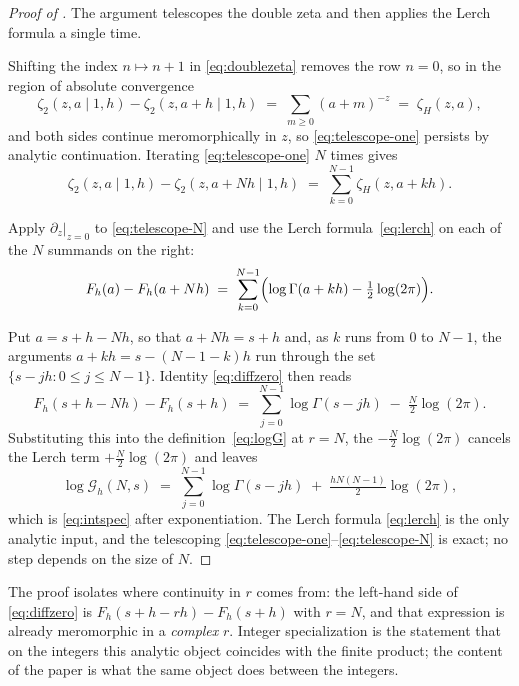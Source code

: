 \documentclass[11pt,letterpaper]{article}
\newcommand{\Gc}{\mathcal{G}}               %
\newcommand{\Fh}{F_h}
\newcommand{\Zt}{\zeta_2}
\begin{document}
\begin{proof}[Proof of ]
The argument telescopes the double zeta and then applies the Lerch formula a
single time.

Shifting the index $n\mapsto n+1$ in \eqref{eq:doublezeta} removes the row
$n=0$, so in the region of absolute convergence
\begin{equation}
  \Zt(z,a\mid 1,h)-\Zt(z,a+h\mid 1,h)\;=\;\sum_{m\ge 0}(a+m)^{-z}\;=\;\zeta_H(z,a),
  \label{eq:telescope-one}
\end{equation}
and both sides continue meromorphically in $z$, so \eqref{eq:telescope-one}
persists by analytic continuation. Iterating \eqref{eq:telescope-one} $N$ times
gives
\begin{equation}
  \Zt(z,a\mid 1,h)-\Zt(z,a+Nh\mid 1,h)
  \;=\;\sum_{k=0}^{N-1}\zeta_H(z,a+kh).
  \label{eq:telescope-N}
\end{equation}

Apply $\partial_z|_{z=0}$ to \eqref{eq:telescope-N} and use the Lerch
formula~\eqref{eq:lerch} on each of the $N$ summands on the right:
\begin{equation}
  \Fh(a)-\Fh(a+Nh)
  \;=\;\sum_{k=0}^{N-1}\Bigl(\log\Gamma(a+kh)-\tfrac12\log(2\pi)\Bigr).
  \label{eq:diffzero}
\end{equation}

Put $a=s+h-Nh$, so that $a+Nh=s+h$ and, as $k$ runs from $0$ to $N-1$, the
arguments $a+kh=s-(N-1-k)h$ run through the set $\{s-jh:0\le j\le N-1\}$.
Identity \eqref{eq:diffzero} then reads
\begin{equation*}
  \Fh(s+h-Nh)-\Fh(s+h)
  \;=\;\sum_{j=0}^{N-1}\log\Gamma(s-jh)\;-\;\tfrac{N}{2}\log(2\pi).
\end{equation*}
Substituting this into the definition~\eqref{eq:logG} at $r=N$, the
$-\tfrac{N}{2}\log(2\pi)$ cancels the Lerch term $+\tfrac{N}{2}\log(2\pi)$ and
leaves
\begin{equation*}
  \log\Gc_h(N,s)
  \;=\;\sum_{j=0}^{N-1}\log\Gamma(s-jh)\;+\;\tfrac{h N(N-1)}{2}\log(2\pi),
\end{equation*}
which is \eqref{eq:intspec} after exponentiation. The Lerch formula
\eqref{eq:lerch} is the only analytic input, and the telescoping
\eqref{eq:telescope-one}--\eqref{eq:telescope-N} is exact; no step depends on
the size of $N$.
\end{proof}

\begin{remark}
The proof isolates where continuity in $r$ comes from: the left-hand side of
\eqref{eq:diffzero} is $\Fh(s+h-rh)-\Fh(s+h)$ with $r=N$, and that expression is
already meromorphic in a \emph{complex} $r$. Integer specialization is the
statement that on the integers this analytic object coincides with the finite
product; the content of the paper is what the same object does between the
integers.
\end{remark}
\end{document}
